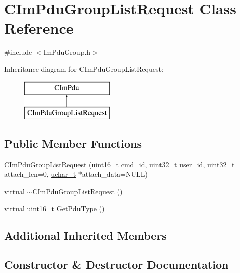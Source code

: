 \hypertarget{class_c_im_pdu_group_list_request}{}\section{C\+Im\+Pdu\+Group\+List\+Request Class Reference}
\label{class_c_im_pdu_group_list_request}


{\ttfamily \#include $<$Im\+Pdu\+Group.\+h$>$}

Inheritance diagram for C\+Im\+Pdu\+Group\+List\+Request\+:\begin{figure}[H]
\begin{center}
\leavevmode
\includegraphics[height=2.000000cm]{class_c_im_pdu_group_list_request}
\end{center}
\end{figure}
\subsection*{Public Member Functions}
\begin{DoxyCompactItemize}
\item 
\hyperlink{class_c_im_pdu_group_list_request_a202382f3d69cd4bdac3d27ae0d6444f5}{C\+Im\+Pdu\+Group\+List\+Request} (uint16\+\_\+t cmd\+\_\+id, uint32\+\_\+t user\+\_\+id, uint32\+\_\+t attach\+\_\+len=0, \hyperlink{base_2ostype_8h_a124ea0f8f4a23a0a286b5582137f0b8d}{uchar\+\_\+t} $\ast$attach\+\_\+data=N\+U\+L\+L)
\item 
virtual \hyperlink{class_c_im_pdu_group_list_request_a0735a5cf2515fc8026c3b889be46202e}{$\sim$\+C\+Im\+Pdu\+Group\+List\+Request} ()
\item 
virtual uint16\+\_\+t \hyperlink{class_c_im_pdu_group_list_request_a224bb4d91de388cde328add42d350ac0}{Get\+Pdu\+Type} ()
\end{DoxyCompactItemize}
\subsection*{Additional Inherited Members}


\subsection{Constructor \& Destructor Documentation}
\hypertarget{class_c_im_pdu_group_list_request_a202382f3d69cd4bdac3d27ae0d6444f5}{}
